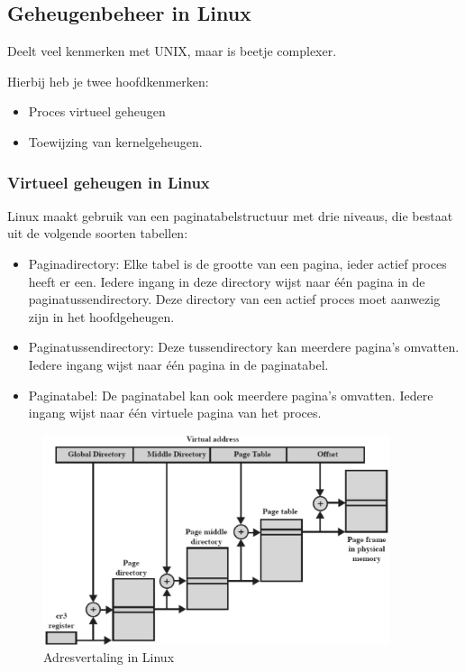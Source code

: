 \subsection{Geheugenbeheer in Linux}

Deelt veel kenmerken met UNIX, maar is beetje complexer. 

Hierbij heb je twee hoofdkenmerken:

\begin{itemize}
\item Proces virtueel geheugen
\item Toewijzing van kernelgeheugen.
\end{itemize}

\subsubsection{Virtueel geheugen in Linux}

Linux maakt gebruik van een paginatabelstructuur met drie niveaus, die bestaat uit de volgende soorten tabellen:

\begin{itemize}
\item Paginadirectory: Elke tabel is de grootte van een pagina, ieder actief proces heeft er een. Iedere ingang in deze directory wijst naar één pagina in de paginatussendirectory. Deze directory van een actief proces moet aanwezig zijn in het hoofdgeheugen.
\item Paginatussendirectory: Deze tussendirectory kan meerdere pagina’s omvatten. Iedere ingang wijst naar één pagina in de paginatabel.
\item Paginatabel: De paginatabel kan ook meerdere pagina’s omvatten. Iedere ingang wijst naar één virtuele pagina van het proces.
\end{itemize}

\begin{figure}[htp]
    \centering
            \includegraphics[width=4in]{img/adresvertalinglinux}
        \caption{Adresvertaling in Linux}
    \label{fig:Adresvertaling in Linux}
\end{figure}

